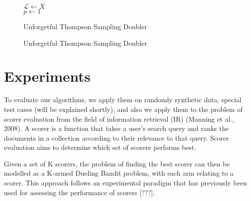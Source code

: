 \documentclass{llncs}
\begin{document}
		\begin{figure}[h]
	\IncMargin{1em}
		\begin{algorithm}[H]
		\BlankLine
		$\mathcal{L} \leftarrow X$\\
		$p\leftarrow 1$\\
			\caption{Unforgetful Thompson Sampling Doubler}
		\end{algorithm}
		\caption{Unforgetful Thompson Sampling Doubler}\label{algo_uts_doubler}
	\end{figure}
		
		\newpage

\section{Experiments}
To evaluate our algorithms, we apply them on randomly synthetic data, special test cases (will be explained shortly), and also we apply them to the problem of scorer evaluation from the field of information retrieval (IR) (Manning et al., 2008).  
A scorer is a function that takes a user's search query and ranks the documents in a collection according to their relevance to that query. Scorer evaluation aims to determine which set of scorers performs best.

Given a set of K scorers, the problem of finding the best scorer can then be modelled as a K-armed Dueling Bandit problem, with each arm relating to a scorer.
This approach follows an experimental paradigm that has previously been
used for assessing the performance of scorers [???].
\end{document}
